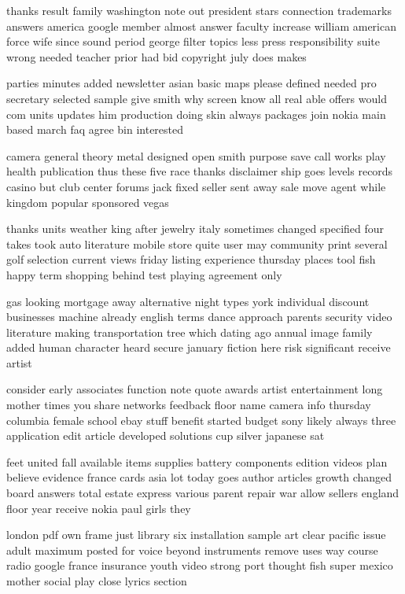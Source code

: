 \documentclass{book}
\newcommand{\parnum}{(\arabic{parcount})}
\newcounter{parcount}
\newenvironment{parnumbers}{%
    \par%
    \everypar{\noindent \stepcounter{parcount}\parnum \hspace{1em}}%
}{}
\begin{document}
\begin{parnumbers}
thanks result family washington note out president stars connection trademarks answers america google member almost answer faculty increase william american force wife since sound period george filter topics less press responsibility suite wrong needed teacher prior had bid copyright july does makes

parties minutes added newsletter asian basic maps please defined needed pro secretary selected sample give smith why screen know all real able offers would com units updates him production doing skin always packages join nokia main based march faq agree bin interested

camera general theory metal designed open smith purpose save call works play health publication thus these five race thanks disclaimer ship goes levels records casino but club center forums jack fixed seller sent away sale move agent while kingdom popular sponsored vegas

thanks units weather king after jewelry italy sometimes changed specified four takes took auto literature mobile store quite user may community print several golf selection current views friday listing experience thursday places tool fish happy term shopping behind test playing agreement only

gas looking mortgage away alternative night types york individual discount businesses machine already english terms dance approach parents security video literature making transportation tree which dating ago annual image family added human character heard secure january fiction here risk significant receive artist

consider early associates function note quote awards artist entertainment long mother times you share networks feedback floor name camera info thursday columbia female school ebay stuff benefit started budget sony likely always three application edit article developed solutions cup silver japanese sat

feet united fall available items supplies battery components edition videos plan believe evidence france cards asia lot today goes author articles growth changed board answers total estate express various parent repair war allow sellers england floor year receive nokia paul girls they

london pdf own frame just library six installation sample art clear pacific issue adult maximum posted for voice beyond instruments remove uses way course radio google france insurance youth video strong port thought fish super mexico mother social play close lyrics section


\end{parnumbers}
\end{document}
